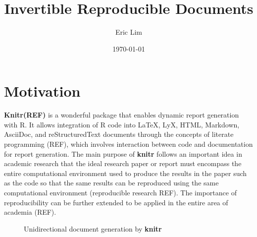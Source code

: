 \documentclass[a4paper, 12pt]{report}
\title{\textbf{Invertible Reproducible Documents}}
\author{Eric Lim}
\date{\today}
\begin{document}
  \maketitle


\chapter{Motivation}
\label{ch:motiv}


\textbf{Knitr(REF)} is a wonderful package that enables dynamic report generation with R. It allows integration of R code into LaTeX, LyX, HTML, Markdown, AsciiDoc, and reStructuredText documents through the concepts of literate programming (REF), which involves interaction between code and documentation for report generation. The main purpose of \textbf{knitr} follows an important idea in academic research that the ideal research paper or report must encompass the entire computational environment used to produce the results in the paper such as the code so that the same results can be reproduced using the same computational environment (reproducible research REF). The importance of reproducibility can be further extended to be applied in the entire area of academia (REF). %

\begin{figure}[h]
\centering
  \caption{Unidirectional document generation by \textbf{knitr}}
  \label{fig:1}
\end{figure}
\end{document}
